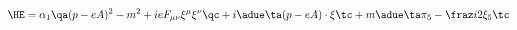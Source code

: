 \begin{equation}
\HE=\alpha_1\qa(p - eA)^2-m^2+ie F_{\mu\nu}\xi^\mu\xi^\nu\qc
+i\adue\ta(p-eA)\cdot\xi\tc+m\adue \ta\pi_5-\fraz i2\xi_5\tc
\label{secondconstr}
\end{equation}


